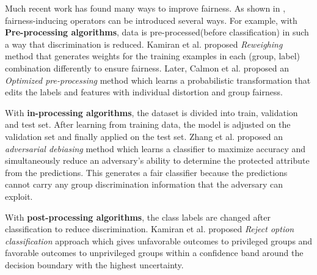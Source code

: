  Much recent work has found many ways to   improve fairness.  
As shown in  ,  fairness-inducing operators
 can be introduced several ways. For example, 
 with \textbf{Pre-processing algorithms}, data is pre-processed(before classification) in such a way that discrimination is reduced. Kamiran et al. proposed \textit{Reweighing} \cite{kamiran2012data} method that generates weights for the training examples in each (group, label) combination differently to ensure fairness. Later, Calmon et al. proposed an \textit{Optimized pre-processing} method \cite{NIPS2017_6988} which learns a probabilistic transformation that edits the labels and features with individual distortion and group fairness.




 
With \textbf{in-processing algorithms}, the  dataset is divided into train, validation and test set. After learning from training data, the model is adjusted on the validation set and finally applied on the test set. Zhang et al. proposed an \textit{adversarial debiasing}  \cite{Zhang:2018:MUB:3278721.3278779} method which learns a classifier to maximize accuracy and simultaneously reduce an adversary's ability to determine the protected attribute from the predictions. This generates a fair classifier because the predictions cannot carry any group discrimination information that the adversary can exploit.

With  \textbf{post-processing algorithms}, the class labels are changed after classification to reduce discrimination. Kamiran et al. proposed \textit{Reject option classification} approach \cite{Kamiran:2018:ERO:3165328.3165686} which gives unfavorable outcomes to privileged groups and favorable outcomes to unprivileged groups within a confidence band around the decision boundary with the highest uncertainty.
 
 


